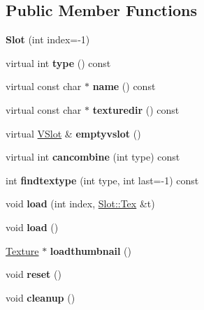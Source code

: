\subsection*{Public Member Functions}
\begin{DoxyCompactItemize}
\item 
\mbox{\label{struct_slot_a20ac8653c8c4536ffca4cea7bee4a039}} 
{\bfseries Slot} (int index=-\/1)
\item 
\mbox{\label{struct_slot_a7ca40c8a17b45e88a0e77e266d286239}} 
virtual int {\bfseries type} () const
\item 
\mbox{\label{struct_slot_a3f5cb98a12ddc0713823733a8027124b}} 
virtual const char $\ast$ {\bfseries name} () const
\item 
\mbox{\label{struct_slot_a7cb2acd16cf8ce7512da86f46097dd06}} 
virtual const char $\ast$ {\bfseries texturedir} () const
\item 
\mbox{\label{struct_slot_af4cf238f6a36c3c241941b8c4a28baba}} 
virtual \hyperlink{struct_v_slot}{V\+Slot} \& {\bfseries emptyvslot} ()
\item 
\mbox{\label{struct_slot_a2defa39db6859e05115d65488fdaaa58}} 
virtual int {\bfseries cancombine} (int type) const
\item 
\mbox{\label{struct_slot_a880cae62250a7b71bcb3df0024ba55d5}} 
int {\bfseries findtextype} (int type, int last=-\/1) const
\item 
\mbox{\label{struct_slot_a29d89cb3dd5dc1027c3b2baaa11818aa}} 
void {\bfseries load} (int index, \hyperlink{struct_slot_1_1_tex}{Slot\+::\+Tex} \&t)
\item 
\mbox{\label{struct_slot_a9d16183908013bc7ac371d15406eb60e}} 
void {\bfseries load} ()
\item 
\mbox{\label{struct_slot_a1c03515604972228df2b940a04ff1309}} 
\hyperlink{struct_texture}{Texture} $\ast$ {\bfseries loadthumbnail} ()
\item 
\mbox{\label{struct_slot_a280788a152c280940fb9e2703a206863}} 
void {\bfseries reset} ()
\item 
\mbox{\label{struct_slot_aa4a08a2de23783c3846553404cf17e73}} 
void {\bfseries cleanup} ()
\end{DoxyCompactItemize}
